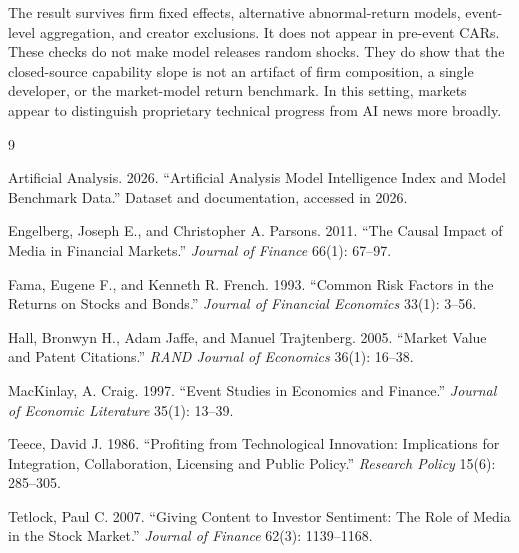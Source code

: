 \documentclass[12pt]{article}
\begin{document}
The result survives firm fixed effects, alternative abnormal-return models,
event-level aggregation, and creator exclusions. It does not appear in pre-event
CARs. These checks do not make model releases random shocks. They do show that
the closed-source capability slope is not an artifact of firm composition, a
single developer, or the market-model return benchmark. In this setting, markets
appear to distinguish proprietary technical progress from AI news more broadly.

\newpage

\begin{thebibliography}{9}

Artificial Analysis. 2026.
``Artificial Analysis Model Intelligence Index and Model Benchmark Data.''
Dataset and documentation, accessed in 2026.

Engelberg, Joseph E., and Christopher A. Parsons. 2011.
``The Causal Impact of Media in Financial Markets.''
\textit{Journal of Finance} 66(1): 67--97.

Fama, Eugene F., and Kenneth R. French. 1993.
``Common Risk Factors in the Returns on Stocks and Bonds.''
\textit{Journal of Financial Economics} 33(1): 3--56.

Hall, Bronwyn H., Adam Jaffe, and Manuel Trajtenberg. 2005.
``Market Value and Patent Citations.''
\textit{RAND Journal of Economics} 36(1): 16--38.

MacKinlay, A. Craig. 1997.
``Event Studies in Economics and Finance.''
\textit{Journal of Economic Literature} 35(1): 13--39.

Teece, David J. 1986.
``Profiting from Technological Innovation: Implications for Integration,
Collaboration, Licensing and Public Policy.''
\textit{Research Policy} 15(6): 285--305.

Tetlock, Paul C. 2007.
``Giving Content to Investor Sentiment: The Role of Media in the Stock Market.''
\textit{Journal of Finance} 62(3): 1139--1168.

\end{thebibliography}
\end{document}
